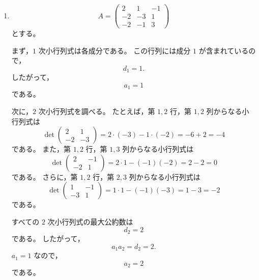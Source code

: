 \begin{solution}
\begin{enumerate}
		さらに，
		\[
		PAQ
		=
		\begin{pmatrix}
			1&0\\
			0&8
		\end{pmatrix}
		\]
		である。
		したがって，
		\[
		\boxed{
			PAQ=\operatorname{diag}(1,8)
		}
		\]
		である。
		
		\item
		\[
		A=
		\begin{pmatrix}
			2&1&-1\\
			-2&-3&1\\
			-2&-1&3
		\end{pmatrix}
		\]
		とする。
		
		まず，\(1\) 次小行列式は各成分である。
		この行列には成分 \(1\) が含まれているので，
		\[
		d_1=1.
		\]
		したがって，
		\[
		a_1=1
		\]
		である。
		
		次に，\(2\) 次小行列式を調べる。
		たとえば，第 \(1,2\) 行，第 \(1,2\) 列からなる小行列式は
		\[
		\det
		\begin{pmatrix}
			2&1\\
			-2&-3
		\end{pmatrix}
		=
		2\cdot(-3)-1\cdot(-2)
		=
		-6+2
		=
		-4
		\]
		である。
		また，第 \(1,2\) 行，第 \(1,3\) 列からなる小行列式は
		\[
		\det
		\begin{pmatrix}
			2&-1\\
			-2&1
		\end{pmatrix}
		=
		2\cdot 1-(-1)(-2)
		=
		2-2
		=
		0
		\]
		である。
		さらに，第 \(1,2\) 行，第 \(2,3\) 列からなる小行列式は
		\[
		\det
		\begin{pmatrix}
			1&-1\\
			-3&1
		\end{pmatrix}
		=
		1\cdot 1-(-1)(-3)
		=
		1-3
		=
		-2
		\]
		である。
		
		すべての \(2\) 次小行列式の最大公約数は
		\[
		d_2=2
		\]
		である。
		したがって，
		\[
		a_1a_2=d_2=2.
		\]
		\(a_1=1\) なので，
		\[
		a_2=2
		\]
		である。
		

\end{enumerate}
\end{solution}
